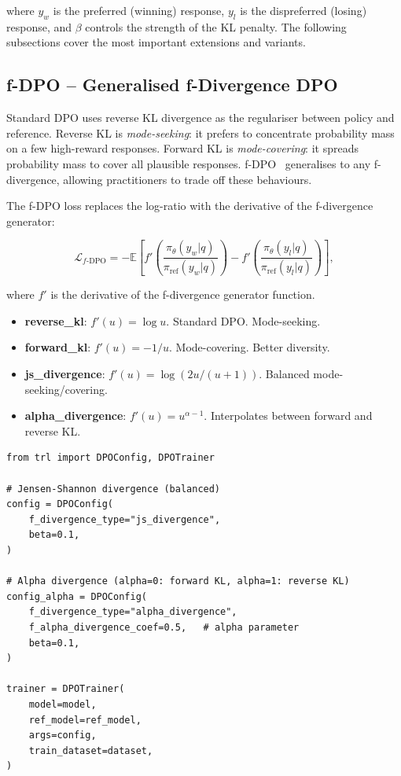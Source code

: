 where $y_w$ is the preferred (winning) response, $y_l$ is the dispreferred (losing) response, and $\beta$ controls the strength of the KL penalty. The following subsections cover the most important extensions and variants.

\subsection{f-DPO -- Generalised f-Divergence DPO}
\label{sec:fdpo}

\begin{intuitionbox}
Standard DPO uses reverse KL divergence as the regulariser between policy and reference. Reverse KL is \emph{mode-seeking}: it prefers to concentrate probability mass on a few high-reward responses. Forward KL is \emph{mode-covering}: it spreads probability mass to cover all plausible responses. f-DPO~\cite{wang2023fdpo} generalises to any f-divergence, allowing practitioners to trade off these behaviours.
\end{intuitionbox}

The f-DPO loss replaces the log-ratio with the derivative of the f-divergence generator:

\[
\mathcal{L}_{f\text{-DPO}} = -\mathbb{E}\!\left[
    f'\!\left(\frac{\pi_\theta(y_w|q)}{\pi_{\text{ref}}(y_w|q)}\right)
    - f'\!\left(\frac{\pi_\theta(y_l|q)}{\pi_{\text{ref}}(y_l|q)}\right)
  \right],
\]

where $f'$ is the derivative of the f-divergence generator function.

\begin{keybox}
\begin{itemize}
  \item \textbf{reverse\_kl}: $f'(u) = \log u$. Standard DPO. Mode-seeking.
  \item \textbf{forward\_kl}: $f'(u) = -1/u$. Mode-covering. Better diversity.
  \item \textbf{js\_divergence}: $f'(u) = \log(2u/(u+1))$. Balanced mode-seeking/covering.
  \item \textbf{alpha\_divergence}: $f'(u) = u^{\alpha-1}$. Interpolates between forward and reverse KL.
\end{itemize}
\end{keybox}

\begin{examplebox}
\begin{lstlisting}[style=pythonstyle]
from trl import DPOConfig, DPOTrainer

# Jensen-Shannon divergence (balanced)
config = DPOConfig(
    f_divergence_type="js_divergence",
    beta=0.1,
)

# Alpha divergence (alpha=0: forward KL, alpha=1: reverse KL)
config_alpha = DPOConfig(
    f_divergence_type="alpha_divergence",
    f_alpha_divergence_coef=0.5,   # alpha parameter
    beta=0.1,
)

trainer = DPOTrainer(
    model=model,
    ref_model=ref_model,
    args=config,
    train_dataset=dataset,
)
\end{lstlisting}
\end{examplebox}

